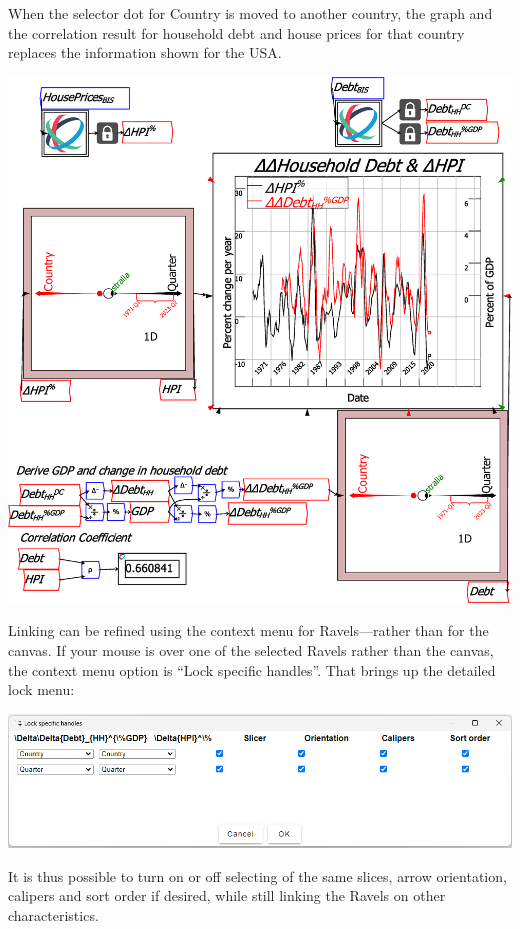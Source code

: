 When the selector dot for Country is moved to another country, the
graph and the correlation result for household debt and house prices
for that country replaces the information shown for the USA.

\noindent\includegraphics[width=\textwidth]{images/RavelLinking2ndCountry}

Linking can be refined using the context menu for Ravels---rather
than for the canvas. If your mouse is over one of the selected Ravels
rather than the canvas, the context menu option is ``Lock specific
handles''. That brings up the detailed lock menu:

\noindent\includegraphics[width=\textwidth]{images/RavelLockSpecificHandles}

It is thus possible to turn on or off selecting of the same slices,
arrow orientation, calipers and sort order if desired, while still
linking the Ravels on other characteristics.

